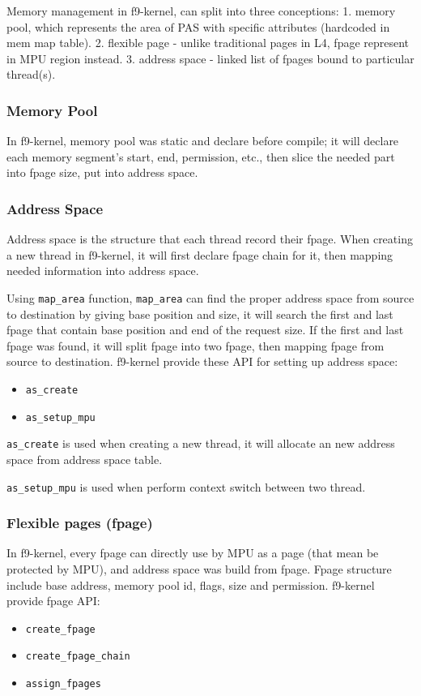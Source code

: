 \documentclass[10pt,preprint,nocopyrightspace]{sigplanconf}
\begin{document}
Memory management in f9-kernel, can split into three conceptions: 1. memory pool, which represents the area of PAS with specific attributes (hardcoded in mem map table). 2. flexible page - unlike traditional pages in L4, fpage represent in MPU region instead. 3. address space - linked list of fpages bound to particular thread(s).

\subsubsection{Memory Pool}
In f9-kernel, memory pool was static and declare before compile; it will declare each memory segment's start, end, permission, etc., then slice the needed part into fpage size, put into address space.

\subsubsection{Address Space}
Address space is the structure that each thread record their fpage. When creating a new thread in f9-kernel, it will first declare fpage chain for it, then mapping needed information into address space.

Using \texttt{map{\_}area} function, \texttt{map{\_}area} can find the proper address space from source to destination by giving base position and size, it will search the first and last fpage that contain base position and end of the request size. If the first and last fpage was found, it will split fpage into two fpage, then mapping fpage from source to destination. f9-kernel provide these API for setting up address space: 
\begin{itemize}
\item \verb|as_create|
\item \verb|as_setup_mpu|
\end{itemize}

\verb|as_create| is used when creating a new thread, it will allocate an new address space from address space table.

\verb|as_setup_mpu| is used when perform context switch between two thread.


\subsubsection{Flexible pages (fpage)}
In f9-kernel, every fpage can directly use by MPU as a page (that mean be protected by MPU), and address space was build from fpage. Fpage structure include base address, memory pool id, flags, size and permission. f9-kernel provide fpage API:
\begin{itemize}
	\item \verb|create_fpage|
	\item \verb|create_fpage_chain|
	\item \verb|assign_fpages|
\end{itemize}
\end{document}
